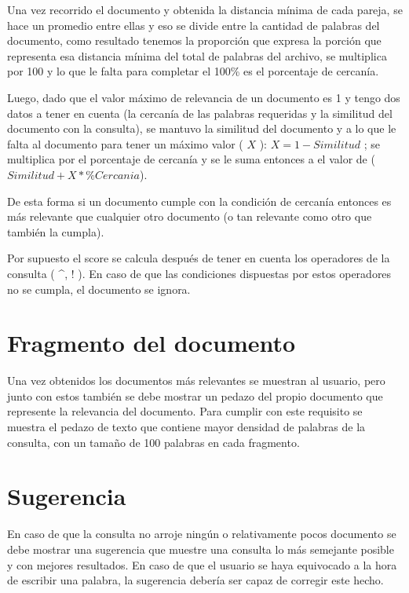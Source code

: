 \documentclass[10pt]{article}
\begin{document}
Una vez recorrido el documento y obtenida la distancia mínima de cada pareja, se hace un promedio entre ellas y eso se divide entre la cantidad de palabras del documento, como resultado tenemos la proporción que expresa la porción que representa esa distancia mínima del total de palabras del archivo, se multiplica por 100 y lo que le falta para completar el 100\% es el porcentaje de cercanía.
 
Luego, dado que el valor máximo de relevancia de un documento es 1 y tengo dos datos a tener en cuenta (la cercanía de las palabras requeridas y la similitud del documento con la consulta), se mantuvo la similitud del documento y a lo que le falta al documento para tener un máximo valor ( $X$ ): \( X = 1 - Similitud \) ; se multiplica por el porcentaje de cercanía y se le suma entonces a el valor de  (\( Similitud + X * \%Cercania \)).

De esta forma si un documento cumple con la condición de cercanía entonces es más relevante que cualquier otro documento (o tan relevante como otro que también la cumpla).

Por supuesto el score se calcula después de tener en cuenta los operadores de la consulta ( \textasciicircum{}, ! ). En caso de que las condiciones dispuestas por estos operadores no se cumpla, el documento se ignora.

\section{Fragmento del documento}
\label{sec:snippet}

Una vez obtenidos los documentos más relevantes se muestran al usuario, pero junto con estos también se debe mostrar un pedazo del propio documento que represente la relevancia del documento. Para cumplir con este requisito se muestra el pedazo de texto que contiene mayor densidad de palabras de la consulta, con un tamaño de 100 palabras en cada fragmento.

\section{Sugerencia}
\label{sec:suggestion}
 
En caso de que la consulta no arroje ningún o relativamente pocos documento se debe mostrar una sugerencia que muestre una consulta lo más semejante posible y con mejores resultados. En caso de que el usuario se haya equivocado a la hora de escribir una palabra, la sugerencia debería ser capaz de corregir este hecho.
\end{document}

